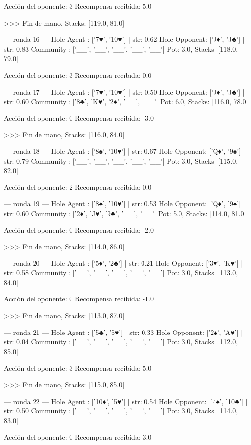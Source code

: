 Acción del oponente: 3
Recompensa recibida: 5.0

>>> Fin de mano, Stacks: [119.0, 81.0]


--- ronda 16 ---
Hole Agent : ['7♥', '10♥'] | str: 0.62
Hole Opponent: ['J♦', 'J♣'] | str: 0.83
Community  : ['__', '__', '__', '__', '__']
Pot: 3.0, Stacks: [118.0, 79.0]

Acción del oponente: 3
Recompensa recibida: 0.0

--- ronda 17 ---
Hole Agent : ['7♥', '10♥'] | str: 0.50
Hole Opponent: ['J♦', 'J♣'] | str: 0.60
Community  : ['8♣', 'K♥', '2♠', '__', '__']
Pot: 6.0, Stacks: [116.0, 78.0]

Acción del oponente: 0
Recompensa recibida: -3.0

>>> Fin de mano, Stacks: [116.0, 84.0]


--- ronda 18 ---
Hole Agent : ['8♠', '10♥'] | str: 0.67
Hole Opponent: ['Q♦', '9♠'] | str: 0.79
Community  : ['__', '__', '__', '__', '__']
Pot: 3.0, Stacks: [115.0, 82.0]

Acción del oponente: 2
Recompensa recibida: 0.0

--- ronda 19 ---
Hole Agent : ['8♠', '10♥'] | str: 0.53
Hole Opponent: ['Q♦', '9♠'] | str: 0.60
Community  : ['2♦', 'J♥', '9♣', '__', '__']
Pot: 5.0, Stacks: [114.0, 81.0]

Acción del oponente: 0
Recompensa recibida: -2.0

>>> Fin de mano, Stacks: [114.0, 86.0]


--- ronda 20 ---
Hole Agent : ['5♦', '2♣'] | str: 0.21
Hole Opponent: ['3♥', 'K♥'] | str: 0.58
Community  : ['__', '__', '__', '__', '__']
Pot: 3.0, Stacks: [113.0, 84.0]

Acción del oponente: 0
Recompensa recibida: -1.0

>>> Fin de mano, Stacks: [113.0, 87.0]


--- ronda 21 ---
Hole Agent : ['5♣', '5♥'] | str: 0.33
Hole Opponent: ['2♠', 'A♥'] | str: 0.04
Community  : ['__', '__', '__', '__', '__']
Pot: 3.0, Stacks: [112.0, 85.0]

Acción del oponente: 3
Recompensa recibida: 5.0

>>> Fin de mano, Stacks: [115.0, 85.0]


--- ronda 22 ---
Hole Agent : ['10♦', '5♥'] | str: 0.54
Hole Opponent: ['4♠', '10♣'] | str: 0.50
Community  : ['__', '__', '__', '__', '__']
Pot: 3.0, Stacks: [114.0, 83.0]

Acción del oponente: 0
Recompensa recibida: 3.0


